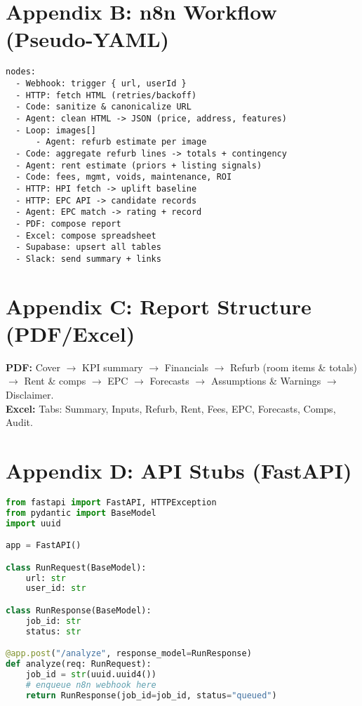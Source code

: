 \documentclass[12pt,a4paper]{article}
\begin{document}
\section*{Appendix B: n8n Workflow (Pseudo-YAML)}
\begin{lstlisting}
nodes:
  - Webhook: trigger { url, userId }
  - HTTP: fetch HTML (retries/backoff)
  - Code: sanitize & canonicalize URL
  - Agent: clean HTML -> JSON (price, address, features)
  - Loop: images[]
      - Agent: refurb estimate per image
  - Code: aggregate refurb lines -> totals + contingency
  - Agent: rent estimate (priors + listing signals)
  - Code: fees, mgmt, voids, maintenance, ROI
  - HTTP: HPI fetch -> uplift baseline
  - HTTP: EPC API -> candidate records
  - Agent: EPC match -> rating + record
  - PDF: compose report
  - Excel: compose spreadsheet
  - Supabase: upsert all tables
  - Slack: send summary + links
\end{lstlisting}

\section*{Appendix C: Report Structure (PDF/Excel)}
\textbf{PDF:} Cover $\rightarrow$ KPI summary $\rightarrow$ Financials $\rightarrow$ Refurb (room items \& totals) $\rightarrow$ Rent \& comps $\rightarrow$ EPC $\rightarrow$ Forecasts $\rightarrow$ Assumptions \& Warnings $\rightarrow$ Disclaimer. \\
\textbf{Excel:} Tabs: Summary, Inputs, Refurb, Rent, Fees, EPC, Forecasts, Comps, Audit.

\section*{Appendix D: API Stubs (FastAPI)}
\begin{lstlisting}[language=Python]
from fastapi import FastAPI, HTTPException
from pydantic import BaseModel
import uuid

app = FastAPI()

class RunRequest(BaseModel):
    url: str
    user_id: str

class RunResponse(BaseModel):
    job_id: str
    status: str

@app.post("/analyze", response_model=RunResponse)
def analyze(req: RunRequest):
    job_id = str(uuid.uuid4())
    # enqueue n8n webhook here
    return RunResponse(job_id=job_id, status="queued")
\end{lstlisting}
\end{document}

